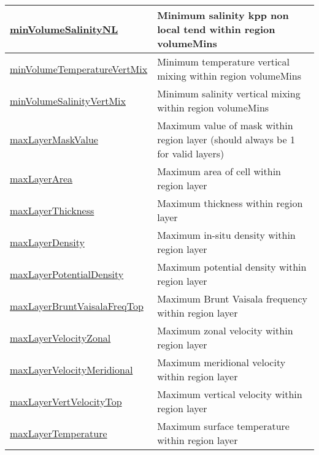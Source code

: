 {\begin{center}
\begin{longtable}{| p{2.0in} | p{4.0in} |}
    \hline
    \hyperref[subsec:var_sec_layerVolumeWeightedAverageAM_minVolumeSalinityNL]{minVolumeSalinityNL} & Minimum salinity kpp non local tend within region volumeMins \\
    \hline
    \hyperref[subsec:var_sec_layerVolumeWeightedAverageAM_minVolumeTemperatureVertMix]{minVolumeTemperatureVertMix} & Minimum temperature vertical mixing within region volumeMins \\
    \hline
    \hyperref[subsec:var_sec_layerVolumeWeightedAverageAM_minVolumeSalinityVertMix]{minVolumeSalinityVertMix} & Minimum salinity vertical mixing within region volumeMins \\
    \hline
    \hyperref[subsec:var_sec_layerVolumeWeightedAverageAM_maxLayerMaskValue]{maxLayerMaskValue} & Maximum value of mask within region layer (should always be 1 for valid layers) \\
    \hline
    \hyperref[subsec:var_sec_layerVolumeWeightedAverageAM_maxLayerArea]{maxLayerArea} & Maximum area of cell within region layer \\
    \hline
    \hyperref[subsec:var_sec_layerVolumeWeightedAverageAM_maxLayerThickness]{maxLayerThickness} & Maximum thickness within region layer \\
    \hline
    \hyperref[subsec:var_sec_layerVolumeWeightedAverageAM_maxLayerDensity]{maxLayerDensity} & Maximum in-situ density within region layer \\
    \hline
    \hyperref[subsec:var_sec_layerVolumeWeightedAverageAM_maxLayerPotentialDensity]{maxLayerPotentialDensity} & Maximum potential density within region layer \\
    \hline
    \hyperref[subsec:var_sec_layerVolumeWeightedAverageAM_maxLayerBruntVaisalaFreqTop]{maxLayerBruntVaisalaFreqTop} & Maximum Brunt Vaisala frequency within region layer \\
    \hline
    \hyperref[subsec:var_sec_layerVolumeWeightedAverageAM_maxLayerVelocityZonal]{maxLayerVelocityZonal} & Maximum zonal velocity within region layer \\
    \hline
    \hyperref[subsec:var_sec_layerVolumeWeightedAverageAM_maxLayerVelocityMeridional]{maxLayerVelocityMeridional} & Maximum meridional velocity within region layer \\
    \hline
    \hyperref[subsec:var_sec_layerVolumeWeightedAverageAM_maxLayerVertVelocityTop]{maxLayerVertVelocityTop} & Maximum vertical velocity within region layer \\
    \hline
    \hyperref[subsec:var_sec_layerVolumeWeightedAverageAM_maxLayerTemperature]{maxLayerTemperature} & Maximum surface temperature within region layer \\

\end{longtable}
\end{center}}
